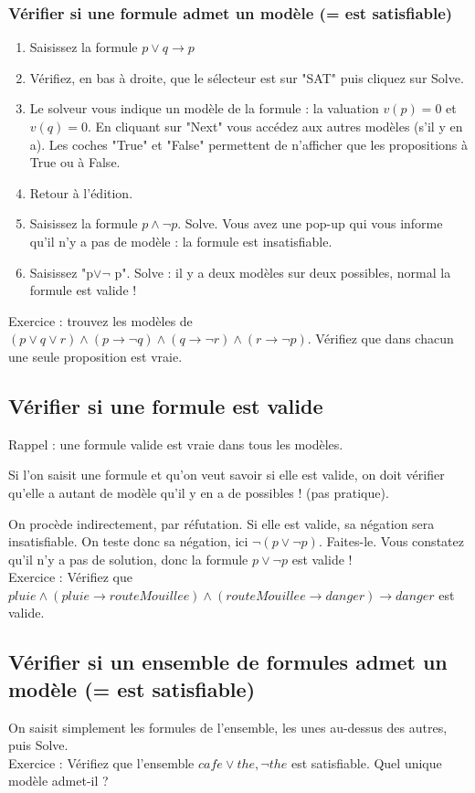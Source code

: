\subsubsection{Vérifier si une formule admet un modèle (= est satisfiable)}
\begin{enumerate}
\item Saisissez la formule $p\vee q\rightarrow p$
\item Vérifiez, en bas à droite, que le sélecteur est sur "SAT" puis cliquez sur Solve.
\item Le solveur vous indique un modèle de la formule : la valuation $v(p)=0$ et $v(q)=0$. En cliquant sur "Next" vous accédez aux autres modèles (s'il y en a). Les coches "True" et "False" permettent de n'afficher que les propositions à True ou à False. 
\item Retour à l'édition.
\item Saisissez la formule $p\wedge\neg p$. Solve. Vous avez une pop-up qui vous informe qu'il n'y a pas de modèle : la formule est insatisfiable. 
\item Saisissez "p$\vee \neg$ p". Solve : il y a deux modèles sur deux possibles, normal la formule est valide !
\end{enumerate}
Exercice : trouvez les modèles de $(p \vee q \vee r) \wedge (p \rightarrow \neg q) \wedge (q \rightarrow \neg r) \wedge (r\rightarrow \neg p)$. Vérifiez que dans chacun une seule proposition est vraie. 

\subsection{Vérifier si une formule est valide}
Rappel : une formule valide est vraie dans tous les modèles. 

Si l'on saisit une formule et qu'on veut savoir si elle est valide, on doit vérifier qu'elle a autant de modèle qu'il y en a de possibles ! (pas pratique).

On procède indirectement, par réfutation. Si elle est valide, sa négation sera insatisfiable. On teste donc sa négation, ici $\neg(p\vee \neg p)$. Faites-le. Vous constatez qu'il n'y a pas de solution, donc la formule $p\vee \neg p$ est valide ! \\

Exercice : Vérifiez que $pluie \wedge (pluie \rightarrow routeMouillee) \wedge (routeMouillee\rightarrow danger) \rightarrow danger$ est valide. 
\subsection{Vérifier si un ensemble de formules admet un modèle (= est satisfiable)}
On saisit simplement les formules de l'ensemble, les unes au-dessus des autres, puis Solve. \\
Exercice : Vérifiez que l'ensemble $\mathit{cafe\vee the, \neg the}$ est satisfiable. Quel unique modèle admet-il ? 
